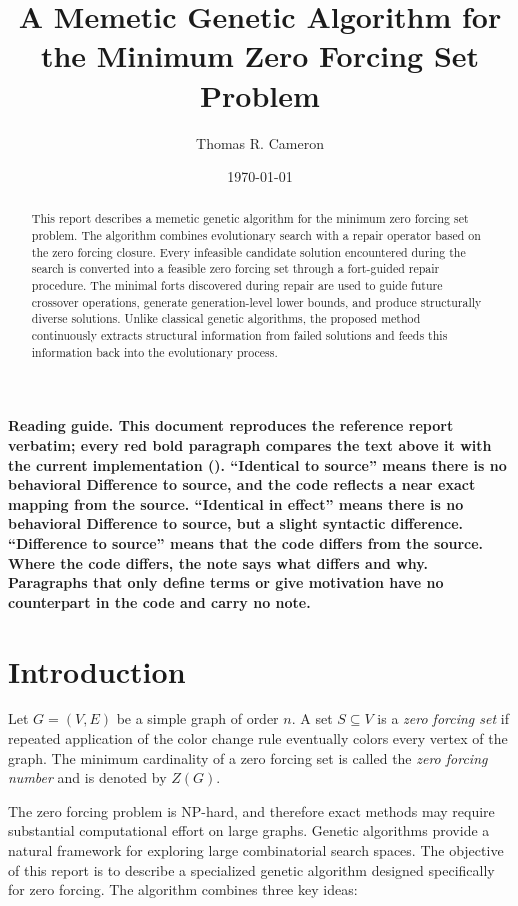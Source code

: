 \documentclass[11pt]{article}
\title{A Memetic Genetic Algorithm for the Minimum Zero Forcing Set Problem}
\author{Thomas R. Cameron}
\date{\today}
\newenvironment{diff}{\par\medskip\noindent\begingroup\color{red}\bfseries\boldmath}{\par\endgroup\medskip}
\newcommand{\code}[1]{{\mdseries\ttfamily\detokenize{#1}}}
\begin{document}
\maketitle
\begin{diff}
Reading guide. This document reproduces the reference report verbatim; every red bold paragraph compares the text above it with the current implementation (\code{genetic_solver.cpp}). ``Identical to source'' means there is no behavioral Difference to source, and the code reflects a near exact mapping from the source. ``Identical in effect'' means there is no behavioral Difference to source, but a slight syntactic difference. ``Difference to source'' means that the code differs from the source. Where the code differs, the note says what differs and why. Paragraphs that only define terms or give motivation have no counterpart in the code and carry no note.
\end{diff}


\begin{abstract}
This report describes a memetic genetic algorithm for the minimum
zero forcing set problem. The algorithm combines evolutionary search
with a repair operator based on the zero forcing closure. Every
infeasible candidate solution encountered during the search is
converted into a feasible zero forcing set through a fort-guided
repair procedure. The minimal forts discovered during repair are
used to guide future crossover operations, generate generation-level
lower bounds, and produce structurally diverse solutions. Unlike
classical genetic algorithms, the proposed method continuously
extracts structural information from failed solutions and feeds this
information back into the evolutionary process.
\end{abstract}

\section{Introduction}

Let $G=(V,E)$ be a simple graph of order $n$. A set
$S \subseteq V$ is a \emph{zero forcing set} if repeated application
of the color change rule eventually colors every vertex of the graph.
The minimum cardinality of a zero forcing set is called the
\emph{zero forcing number} and is denoted by $Z(G)$.

The zero forcing problem is NP-hard, and therefore exact methods
may require substantial computational effort on large graphs.
Genetic algorithms provide a natural framework for exploring
large combinatorial search spaces. 
The objective of this report is to describe a specialized genetic
algorithm designed specifically for zero forcing. The algorithm
combines three key ideas:
\end{document}

